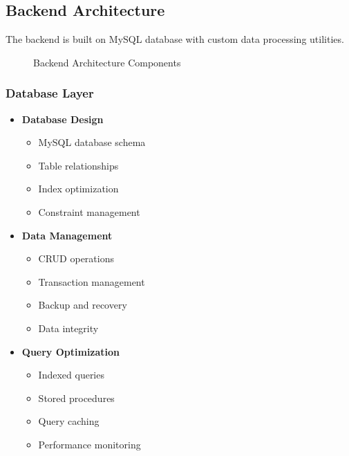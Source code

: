 \documentclass[12pt,a4paper]{article}
\begin{document}
\subsection{Backend Architecture}
The backend is built on MySQL database with custom data processing utilities.

\begin{figure}[h]
\centering
{}
\caption{Backend Architecture Components}
\end{figure}

\subsubsection{Database Layer}
\begin{itemize}
    \item \textbf{Database Design}
    \begin{itemize}
        \item MySQL database schema
        \item Table relationships
        \item Index optimization
        \item Constraint management
    \end{itemize}
    
    \item \textbf{Data Management}
    \begin{itemize}
        \item CRUD operations
        \item Transaction management
        \item Backup and recovery
        \item Data integrity
    \end{itemize}
    
    \item \textbf{Query Optimization}
    \begin{itemize}
        \item Indexed queries
        \item Stored procedures
        \item Query caching
        \item Performance monitoring
    \end{itemize}
\end{itemize}
\end{document}

